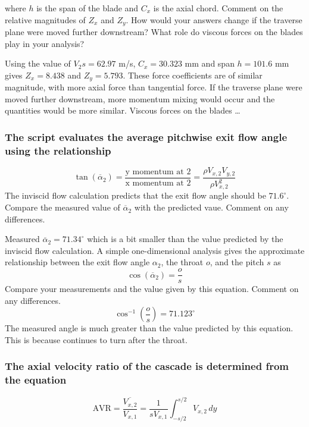 \documentclass{article}
\begin{document}
where $h$ is the span of the blade and $C_x$ is the axial chord. Comment on the relative magnitudes
of $Z_x$ and $Z_y$. How would your answers change if the traverse plane were moved further
downstream? What role do viscous forces on the blades play in your analysis?

Using the value of $V_2s = 62.97$ m/s, $C_x = 30.323$ mm and span $h=101.6$ mm gives $Z_x = 8.438$ and $Z_y = 5.793$.
These force coefficients are of similar magnitude, with more axial force than tangential force.
If the traverse plane were moved further downstream, more momentum mixing would occur and the quantities would be more similar.
Viscous forces on the blades \dots

\subsubsection{The script evaluates the average pitchwise exit flow angle using the relationship
}
\begin{equation}
    \tan (\overline{\alpha}_2) = \frac{\text{y momentum at 2}}{\text{x momentum at 2}} = \frac{\rho V_{x,2}V_{y,2}}{\rho V_{x,2}^2} \label{eq:alpha2}
\end{equation}
The inviscid flow calculation predicts that the exit flow angle should be $71.6^\circ$. Compare the
measured value of $\overline{\alpha}_2$ with the predicted vaue. Comment on any differences.

Measured $\overline{\alpha}_2 = 71.34^\circ$ which is a bit smaller than the value predicted by the inviscid flow calculation.
% 
% 
A simple one-dimensional analysis gives the approximate relationship between the exit flow angle $\alpha_2$, the throat $o$, and the pitch $s$ as
\begin{equation}
    \cos (\overline{\alpha}_2) = \frac{o}{s}
\end{equation}
Compare your measurements and the value given by this equation. Comment on any
differences.
\begin{equation}
    \cos^{-1}\left( \frac{o}{s} \right) = 71.123^\circ
\end{equation}
The measured angle is much greater than the value predicted by this equation.
This is because continues to turn after the throat.

\subsubsection{The axial velocity ratio of the cascade is determined from the equation
}
\begin{equation}
    \text{AVR} = \frac{\overline{V_{x,2}}}{V_{x,1}} = \frac{1}{s V_{x,1}} \int_{-s/2}^{s/2} V_{x,2} \, dy
\end{equation}
\end{document}
